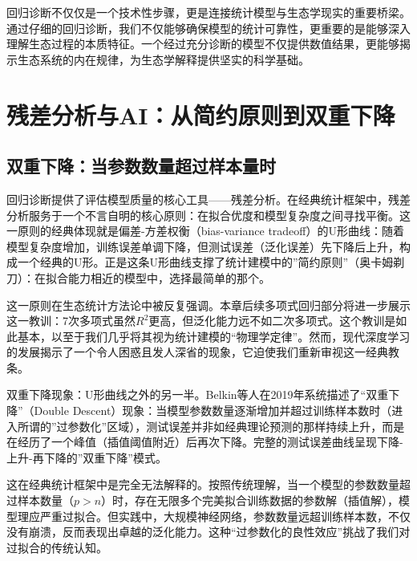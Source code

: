 \documentclass[
  twoside,12pt,fontset=none]{ctexbook}
\begin{document}
回归诊断不仅仅是一个技术性步骤，更是连接统计模型与生态学现实的重要桥梁。通过仔细的回归诊断，我们不仅能够确保模型的统计可靠性，更重要的是能够深入理解生态过程的本质特征。一个经过充分诊断的模型不仅提供数值结果，更能够揭示生态系统的内在规律，为生态学解释提供坚实的科学基础。

\hypertarget{ux6b8bux5deeux5206ux6790ux4e0eaiux4eceux7b80ux7ea6ux539fux5219ux5230ux53ccux91cdux4e0bux964d}{%
\section{残差分析与AI：从简约原则到双重下降}\label{ux6b8bux5deeux5206ux6790ux4e0eaiux4eceux7b80ux7ea6ux539fux5219ux5230ux53ccux91cdux4e0bux964d}}

\hypertarget{ux53ccux91cdux4e0bux964dux5f53ux53c2ux6570ux6570ux91cfux8d85ux8fc7ux6837ux672cux91cfux65f6}{%
\subsection{双重下降：当参数数量超过样本量时}\label{ux53ccux91cdux4e0bux964dux5f53ux53c2ux6570ux6570ux91cfux8d85ux8fc7ux6837ux672cux91cfux65f6}}

回归诊断提供了评估模型质量的核心工具------残差分析。在经典统计框架中，残差分析服务于一个不言自明的核心原则：在拟合优度和模型复杂度之间寻找平衡。这一原则的经典体现就是偏差-方差权衡（bias-variance tradeoff）的U形曲线：随着模型复杂度增加，训练误差单调下降，但测试误差（泛化误差）先下降后上升，构成一个经典的U形。正是这条U形曲线支撑了统计建模中的''简约原则''（奥卡姆剃刀）：在拟合能力相近的模型中，选择最简单的那个。

这一原则在生态统计方法论中被反复强调。本章后续多项式回归部分将进一步展示这一教训：7次多项式虽然\(R^2\)更高，但泛化能力远不如二次多项式。这个教训是如此基本，以至于我们几乎将其视为统计建模的``物理学定律''。然而，现代深度学习的发展揭示了一个令人困惑且发人深省的现象，它迫使我们重新审视这一经典教条。

双重下降现象：U形曲线之外的另一半。Belkin等人在2019年系统描述了``双重下降''（Double Descent）现象：当模型参数数量逐渐增加并超过训练样本数时（进入所谓的''过参数化''区域），测试误差并非如经典理论预测的那样持续上升，而是在经历了一个峰值（插值阈值附近）后再次下降。完整的测试误差曲线呈现下降-上升-再下降的''双重下降''模式。

这在经典统计框架中是完全无法解释的。按照传统理解，当一个模型的参数数量超过样本数量（\(p > n\)）时，存在无限多个完美拟合训练数据的参数解（插值解），模型理应严重过拟合。但实践中，大规模神经网络，参数数量远超训练样本数，不仅没有崩溃，反而表现出卓越的泛化能力。这种``过参数化的良性效应''挑战了我们对过拟合的传统认知。
\end{document}
